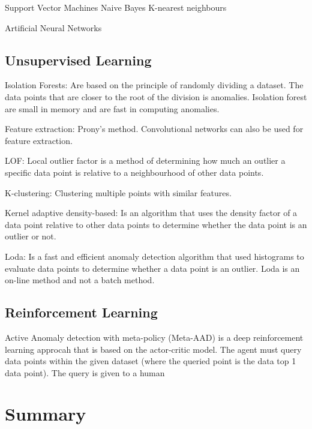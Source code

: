 Support Vector Machines
Naive Bayes
K-nearest neighbours

Artificial Neural Networks

\subsection{Unsupervised Learning}
Isolation Forests: Are based on the principle of randomly dividing a dataset. The data points that are closer to the root of the division is anomalies. Isolation forest are small in memory and are fast in computing anomalies.

Feature extraction: Prony's method. Convolutional networks can also be used for feature extraction.

LOF: Local outlier factor is a method of determining how much an outlier a specific data point is relative to a neighbourhood of other data points.

K-clustering: Clustering multiple points with similar features.

Kernel adaptive density-based: Is an algorithm that uses the density factor of a data point relative to other data points to determine whether the data point is an outlier or not.

Loda: Is a fast and efficient anomaly detection algorithm that used histograms to evaluate data points to determine whether a data point is an outlier. Loda is an on-line method and not a batch method.

\subsection{Reinforcement Learning}
Active Anomaly detection with meta-policy (Meta-AAD) is a deep reinforcement learning approcah that is based on the actor-critic model. The agent must query data points within the given dataset (where the queried point is the data top 1 data point). The query is given to a human 

\section{Summary}

